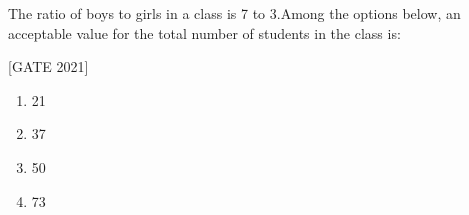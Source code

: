 \iffalse
\title{2021-MA}
\author{EE24BTECH11020 -  Ellanti Rohith}
\section{ma}
\chapter{2021}
\fi





    \item The ratio of boys to girls in a class is 7 to 3.Among the options below, an acceptable value for the total number of students in the class is:

    \hfill{[GATE 2021]}\begin{multicols}{4}
    \begin{enumerate}
        \item 21
        \item 37
        \item 50
        \item 73
    \end{enumerate}
    \end{multicols}

